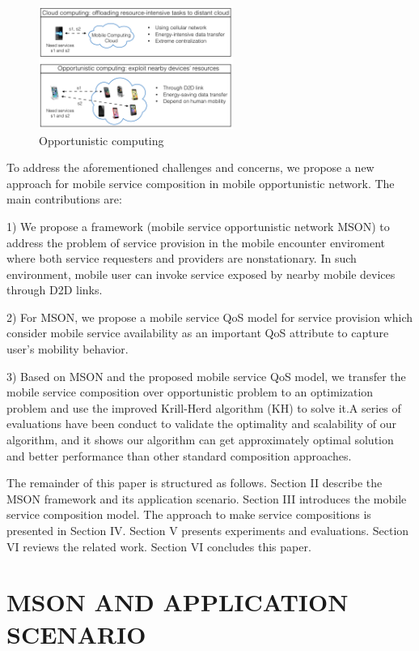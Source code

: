 \documentclass[10pt,journal,compsoc]{IEEEtran}
\begin{document}
\begin{figure}[!t]
\centering
\includegraphics[width=2.5in]{./img/pic1.png}
\caption{Opportunistic computing}
\label{fig_opportunistic}
\end{figure}

To address the aforementioned challenges and concerns, we propose a new approach for mobile service composition in mobile opportunistic network. The main contributions are:

1) We propose a framework (mobile service opportunistic network MSON) to address the problem of service provision in the mobile encounter enviroment where both service requesters and providers are nonstationary. In such environment, mobile user can invoke service exposed by nearby mobile devices through D2D links.

2) For MSON, we propose a mobile service QoS model for service provision which consider mobile service availability as an important QoS attribute to capture user's mobility behavior.

3) Based on MSON and the proposed mobile service QoS model, we transfer the mobile service composition over opportunistic problem to an optimization problem and use the improved Krill-Herd algorithm (KH) to solve it.A series of evaluations have been conduct to validate the optimality and scalability of our algorithm, and it shows our algorithm can get approximately optimal solution and better performance than other standard composition approaches. 

The remainder of this paper is structured as follows. Section II describe the MSON framework and its application scenario. Section III introduces the mobile service composition model. The approach to make service compositions is presented in Section IV. Section V presents experiments and evaluations. Section VI reviews the related work. Section VI concludes this paper.

\section{MSON AND APPLICATION SCENARIO}
\end{document}

